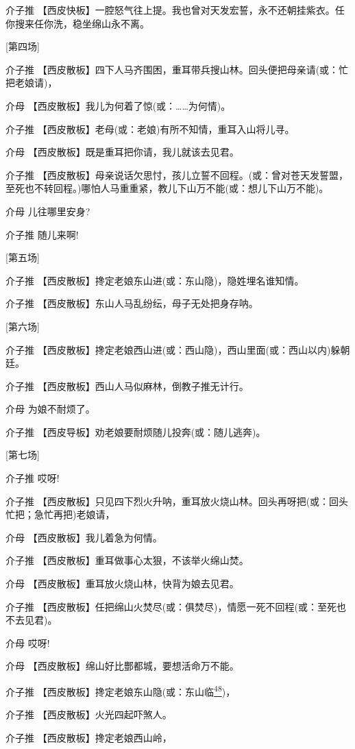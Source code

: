 介子推
【西皮快板】一腔怒气往上提。我也曾对天发宏誓，永不还朝挂紫衣。任你搜来任你洗，稳坐绵山永不离。

{[}第四场{]}

介子推
【西皮散板】四下人马齐围困，重耳带兵搜山林。回头便把母亲请(或：忙把老娘请)，

介母 【西皮散板】我儿为何着了惊(或：\ldots{}\ldots{}为何情)。

介子推 【西皮散板】老母(或：老娘)有所不知情，重耳入山将儿寻。

介母 【西皮散板】既是重耳把你请，我儿就该去见君。

介子推
【西皮散板】母亲说话欠思忖，孩儿立誓不回程。(或：曾对苍天发誓盟，至死也不转回程。)哪怕人马重重紧，教儿下山万不能(或：想儿下山万不能)。

介母 儿往哪里安身?

介子推 随儿来啊!

{[}第五场{]}

介子推 【西皮散板】搀定老娘东山进(或：东山隐)，隐姓埋名谁知情。

介子推 【西皮散板】东山人马乱纷纭，母子无处把身存呐。

{[}第六场{]}

介子推
【西皮散板】搀定老娘西山进(或：西山隐)，西山里面(或：西山以内)躲朝廷。

介子推 【西皮散板】西山人马似麻林，倒教子推无计行。

介母 为娘不耐烦了。

介子推 【西皮导板】劝老娘要耐烦随儿投奔(或：随儿逃奔)。

{[}第七场{]}

介子推 哎呀!

介子推
【西皮散板】只见四下烈火升呐，重耳放火烧山林。回头再呀把(或：回头忙把；急忙再把)老娘请，

介母 【西皮散板】我儿着急为何情。

介子推 【西皮散板】重耳做事心太狠，不该举火绵山焚。

介母 【西皮散板】重耳放火烧山林，快背为娘去见君。

介子推
【西皮散板】任把绵山火焚尽(或：俱焚尽)，情愿一死不回程(或：至死也不去见君)。

介母 哎呀!

介母 【西皮散板】绵山好比酆都城，要想活命万不能。

介子推
【西皮散板】搀定老娘东山隐(或：东山临\protect\hyperlink{fn48}{\textsuperscript{48}})，

介子推 【西皮散板】火光四起吓煞人。

介子推 【西皮散板】搀定老娘西山岭，

